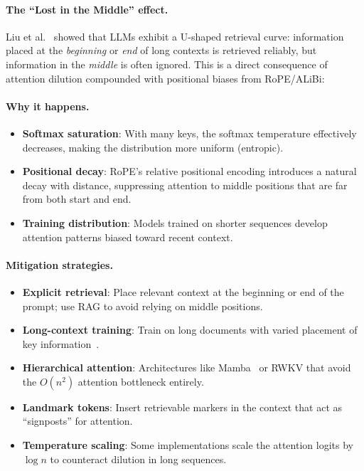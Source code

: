\paragraph{The ``Lost in the Middle'' effect.}
\label{the-lost-in-the-middle-effect.}

Liu et al.~\cite{liu2024lost} showed that LLMs exhibit a U-shaped retrieval curve: information placed at the \emph{beginning} or \emph{end} of long contexts is retrieved reliably, but information in the \emph{middle} is often ignored. This is a direct consequence of attention dilution compounded with positional biases from RoPE/ALiBi:

\paragraph{Why it happens.}
\label{why-it-happens.-1}

\begin{itemize}
  \item \textbf{Softmax saturation}: With many keys, the softmax temperature effectively decreases, making the distribution more uniform (entropic).
  \item \textbf{Positional decay}: RoPE’s relative positional encoding introduces a natural decay with distance, suppressing attention to middle positions that are far from both start and end.
  \item \textbf{Training distribution}: Models trained on shorter sequences develop attention patterns biased toward recent context.
\end{itemize}

\paragraph{Mitigation strategies.}
\label{mitigation-strategies.}

\begin{itemize}
  \item \textbf{Explicit retrieval}: Place relevant context at the beginning or end of the prompt; use RAG to avoid relying on middle positions.
  \item \textbf{Long-context training}: Train on long documents with varied placement of key information~\cite{fu2024data}.
  \item \textbf{Hierarchical attention}: Architectures like Mamba~\cite{gu2024mamba} or RWKV that avoid the $O(n^2)$ attention bottleneck entirely.
  \item \textbf{Landmark tokens}: Insert retrievable markers in the context that act as ``signposts'' for attention.
  \item \textbf{Temperature scaling}: Some implementations scale the attention logits by $\log n$ to counteract dilution in long sequences.
\end{itemize}

